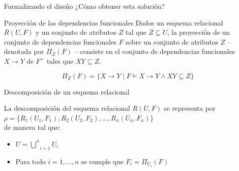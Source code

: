 \begin{frame}{Formalizando el dise\~no}
    \centering
    \Large{ ¿C\'omo obtener esta soluci\'on?}
\end{frame}

\begin{frame}{Proyecci\'on de las dependencias funcionales}
    Dados un esquema relacional $R(U,F)$ y un conjunto de atributos
    $Z$ tal que $Z \subseteq U$, la proyecci\'on de un conjunto de dependencias
    funcionales $F$ sobre un conjunto de atributos $Z$ -- denotada
    por $\Pi_Z(F)$ -- consiste en el conjunto de dependencias funcionales
    $X \to Y$ de $F^+$ tales que $XY \subseteq Z$.
    
    $$
        \Pi_Z(F) = \{X \to Y \;|\; F \models X \to Y \land XY \subseteq Z \}
    $$
\end{frame}







\begin{frame}{Descomposici\'on de un esquema relacional}


        La descomposici\'on del esquema relacional $R(U,F)$ se representa por \\[2mm]
        $\rho = \{R_1(U_1,F_1), R_2(U_2,F_2),...,R_n(U_n,F_n)\}$\\[2mm]
        de manera tal que:
        \begin{itemize}
            \item $U = \underset{i = 1}{\overset{n}{\bigcup}} U_i$
            \item Para todo $i = 1,...,n$ se cumple que $F_i = \Pi_{U_i}(F)$ 
        \end{itemize}
\end{frame}


